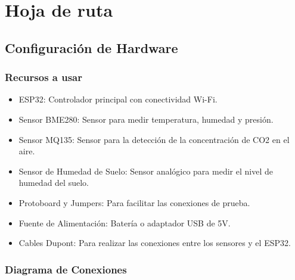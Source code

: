 \documentclass[../main]{subfiles}
\begin{document}
\section{Hoja de ruta}

\subsection{Configuración de Hardware}

\setcounter{subsubsection}{-1}

\subsubsection{Recursos a usar}

\begin{itemize}
	\item ESP32: Controlador principal con conectividad Wi-Fi.
	\item Sensor BME280: Sensor para medir temperatura, humedad y presión.
	\item Sensor MQ135: Sensor para la detección de la concentración de CO2 en el aire.
	\item Sensor de Humedad de Suelo: Sensor analógico para medir el nivel de humedad del suelo.
	\item Protoboard y Jumpers: Para facilitar las conexiones de prueba.
	\item Fuente de Alimentación: Batería o adaptador USB de 5V.
	\item Cables Dupont: Para realizar las conexiones entre los sensores y el ESP32.
\end{itemize}

\subsubsection{Diagrama de Conexiones}
\end{document}

